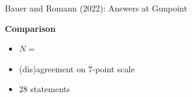 \documentclass[xcolor=table,9pt,aspectratio=169]{beamer}
\begin{document}
\begin{frame}{\vspace*{10mm}Bauer and Romann (2022): Answers at Gunpoint}
\vspace*{-5mm}
\begin{multicols}{2}
\textbf{Comparison}\\
\begin{itemize}
   \item $N=$
   \item (dis)agreement on 7-point scale
   \item 28 statements
\end{itemize}
\vfill
\begin{center}
\end{center}
\end{multicols}
\end{frame}
\end{document}
